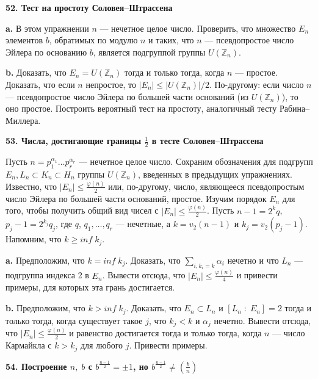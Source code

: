 \documentclass{mai_book}
\begin{document}
\bigskip
\noindent\textbf{52. Тест на простоту Соловея--Штрассена}

\medskip
\textbf{a.} В этом упражнении $n$ --- нечетное целое число. 
Проверить, что множество $E_n$ элементов $b$, обратимых по модулю $n$ и таких, что $n$ --- псевдопростое число Эйлера по основанию $b$, является подгруппой груп­пы $U(\mathbb {Z}_n)$.

\smallskip
\textbf{b.} Доказать, что $E_n=U(\mathbb {Z}_n)$ тогда и только тогда, когда $n$ --- простое. 
Доказать, что если $n$ непростое, то $|E_n|\leq|U(\mathbb {Z}_n)|/2$.
По-другому: если число $n$ --- псевдопростое число Эйлера по большей части оснований (из $U(\mathbb {Z}_n)$), то оно простое. 
Построить вероятный тест на простоту, аналогичный тесту Рабина--Миллера.

\newpage


\noindent\textbf{53. Числа, достигающие границы $\frac{1}2$ в тесте Соловея--Штрассена}

\medskip
Пусть $n=p^{\alpha_1}_1 \dots p^{\alpha_r}_r$ --- нечетное целое число. 
Сохраним обозначения для подгрупп $E_n, L_n \subset K_n \subset H_n$ группы $U(\mathbb {Z}_n)$, введенных в предыдущих упражнениях. 
Известно, что $|E_n|\le \frac{\varphi (n)}2$ или, по-другому, число, являющееся псевдопростым число Эйлера по большей части оснований, простое. 
Изучим порядок $E_n$ для того, чтобы получить общий вид чисел с $|E_n|\le \frac{\varphi (n)}2$. 
Пусть $n-1=2^kq$, $p_j-1=2^{k_j}q_j$, где $q$, $q_1,\dots,q_r$ --- нечетные, а $k=v_2(n-1)$ и $k_j=v_2(p_j-1)$. 
Напомним, что $k\geq inf\;k_j$.

\smallskip
\textbf{a.} Предположим, что $k=inf\;k_j$. 
Доказать, что $\sum_{i,k_i=k}\alpha_i$ нечетно и что $L_n$ --- подгруппа индекса 2 в $E_n$. 
Вывести отсюда, что $|E_n|\le \frac{\varphi (n)}4$ и привести примеры, для которых эта грань достигается.

\smallskip
\textbf{b.} Предположим, что $k > inf\;k_j$. 
Доказать, что $E_n \subset L_n$ и $[L_n\;:\;E_n]=2$ тогда и только тогда, когда существует такое $j$, что $k_j < k$ и $\alpha_j$ нечетно. 
Вывести отсюда, что $|E_n|\le \frac{\varphi (n)}2$ и равенство до­стигается тогда и только тогда, когда $n$ --- число Кармайкла с $k > k_j$ для любого $j$. 
Привести примеры.

\bigskip
\noindent\textbf{54. Построение $n,\;b$ с $b^{\frac{n-1}2}=\pm1$, но $b^{\frac{n-1}2}\neq (\frac{b}n)$}
\end{document}
